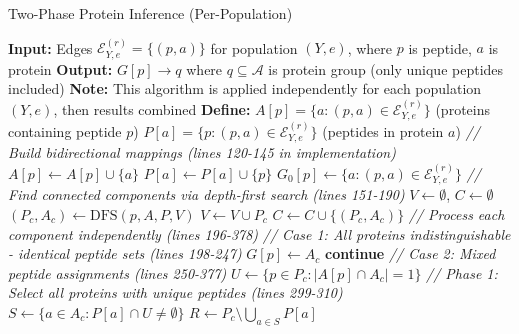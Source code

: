 \documentclass{article}
\begin{document}
\begin{algorithm}[H]
\caption{Two-Phase Protein Inference (Per-Population)}
\begin{algorithmic}[1]
\State \textbf{Input:} Edges $\mathcal{E}^{(r)}_{Y,e} = \{(p, a)\}$ for population $(Y, e)$, where $p$ is peptide, $a$ is protein
\State \textbf{Output:} $G[p] \to q$ where $q \subseteq \mathcal{A}$ is protein group (only unique peptides included)
\State \textbf{Note:} This algorithm is applied independently for each population $(Y, e)$, then results combined
\State \textbf{Define:} $A[p] = \{a : (p, a) \in \mathcal{E}^{(r)}_{Y,e}\}$ (proteins containing peptide $p$)
\State \hspace{2.3em} $P[a] = \{p : (p, a) \in \mathcal{E}^{(r)}_{Y,e}\}$ (peptides in protein $a$)
\State
\State \textit{// Build bidirectional mappings (lines 120-145 in implementation)}
    \State $A[p] \gets A[p] \cup \{a\}$ 
    \State $P[a] \gets P[a] \cup \{p\}$ 
    \State $G_0[p] \gets \{a : (p, a) \in \mathcal{E}^{(r)}_{Y,e}\}$ 
\EndFor
\State
\State \textit{// Find connected components via depth-first search (lines 151-190)}
\State $V \gets \emptyset$, $C \gets \emptyset$ 
        \State $(P_c, A_c) \gets \text{DFS}(p, A, P, V)$ 
        \State $V \gets V \cup P_c$ 
        \State $C \gets C \cup \{(P_c, A_c)\}$
    \EndIf
\EndFor
\State
\State \textit{// Process each component independently (lines 196-378)}
    \State
    \State \textit{// Case 1: All proteins indistinguishable - identical peptide sets (lines 198-247)}
            \State $G[p] \gets A_c$ 
        \EndFor
        \State \textbf{continue}
    \EndIf
    \State
    \State \textit{// Case 2: Mixed peptide assignments (lines 250-377)}
    \State $U \gets \{p \in P_c : |A[p] \cap A_c| = 1\}$ 
    \State
    \State \textit{// Phase 1: Select all proteins with unique peptides (lines 299-310)}
    \State $S \gets \{a \in A_c : P[a] \cap U \neq \emptyset\}$ 
    \State $R \gets P_c \setminus \bigcup_{a \in S} P[a]$ 
    \State

\end{algorithmic}
\end{algorithm}
\end{document}
